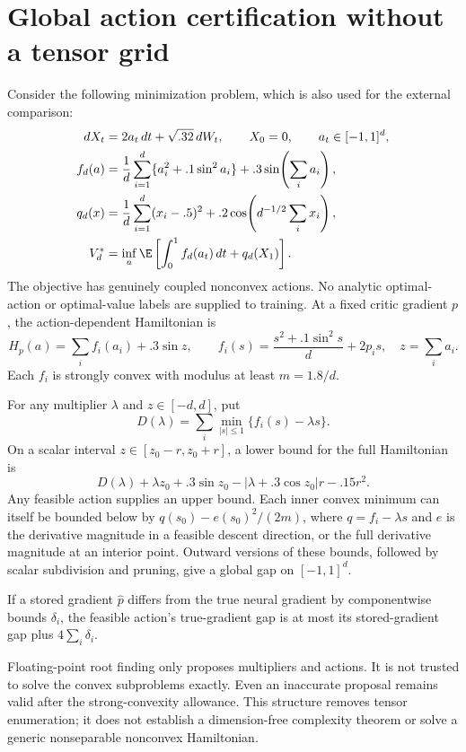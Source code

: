 \section{Global action certification without a tensor grid}\label{r9:action}
Consider the following minimization problem, which is also used for the external comparison:
\begin{align}
 dX_t&=2a_t\,dt+\sqrt{.32}\,dW_t,\qquad X_0=0,
       \qquad a_t\in[-1,1]^d,\\
 f_d(a)&=\frac1d\sum_{i=1}^d\{a_i^2+.1\sin^2a_i\}
                 +.3\sin\!\left(\sum_i a_i\right),\\
 q_d(x)&=\frac1d\sum_{i=1}^d(x_i-.5)^2
                 +.2\cos\!\left(d^{-1/2}\sum_i x_i\right),\label{r9:nonconvex}\\
 V_d^*&=\inf_a\E\left[\int_0^1 f_d(a_t)\,dt+q_d(X_1)\right].\notag
\end{align}
The objective has genuinely coupled nonconvex actions. No analytic optimal-action or optimal-value labels are supplied to training. At a fixed critic gradient $p$, the action-dependent Hamiltonian is
\[
 H_p(a)=\sum_i f_i(a_i)+.3\sin z,\qquad
 f_i(s)=\frac{s^2+.1\sin^2s}{d}+2p_is,\quad z=\sum_i a_i.
\]
Each $f_i$ is strongly convex with modulus at least $m=1.8/d$.

\begin{theorem}\label{r9:actionthm}
For any multiplier $\lambda$ and $z\in[-d,d]$, put
\[
 D(\lambda)=\sum_i\min_{|s|\leq1}\{f_i(s)-\lambda s\}.
\]
On a scalar interval $z\in[z_0-r,z_0+r]$, a lower bound for the full Hamiltonian is
\begin{equation}
 D(\lambda)+\lambda z_0+.3\sin z_0
       -|\lambda+.3\cos z_0|r-.15r^2.\label{r9:actionlower}
\end{equation}
Any feasible action supplies an upper bound. Each inner convex minimum can itself be bounded below by $q(s_0)-e(s_0)^2/(2m)$, where $q=f_i-\lambda s$ and $e$ is the derivative magnitude in a feasible descent direction, or the full derivative magnitude at an interior point. Outward versions of these bounds, followed by scalar subdivision and pruning, give a global gap on $[-1,1]^d$.

If a stored gradient $\widehat p$ differs from the true neural gradient by componentwise bounds $\delta_i$, the feasible action's true-gradient gap is at most its stored-gradient gap plus $4\sum_i\delta_i$.
\end{theorem}
Floating-point root finding only proposes multipliers and actions. It is not trusted to solve the convex subproblems exactly. Even an inaccurate proposal remains valid after the strong-convexity allowance. This structure removes tensor enumeration; it does not establish a dimension-free complexity theorem or solve a generic nonseparable nonconvex Hamiltonian.


